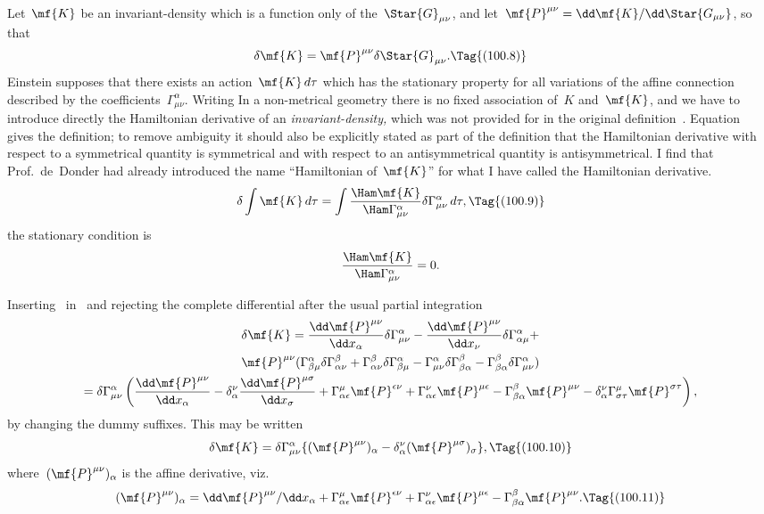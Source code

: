 \documentclass[12pt]{book}
\begin{document}
Let~$\mf{K}$ be an invariant\hyp{}density which is a function only of the~$\Star{G}_{\mu\nu}$, and
let~$\mf{P}^{\mu\nu} = \dd\mf{K}/\dd\Star{G_{\mu\nu}}$, so that
\[
\delta\mf{K} = \mf{P}^{\mu\nu}\delta\Star{G}_{\mu\nu}.
\Tag{(100.8)}
\]
Einstein supposes that there exists an action~$\mf{K}\,d\tau$ which has the stationary property for all variations
of the affine connection described by the coefficients~$\Gamma^\alpha_{\mu\nu}$.
Writing\footnotemark\footnotetext
     {In a non\hyp{}metrical geometry there is no fixed association of~$K$ and~$\mf{K}$, and we have to introduce
      directly the Hamiltonian derivative of an \emph{invariant\hyp{}density,} which was not provided for in
      the original definition~.
      Equation~ gives the definition; to remove ambiguity it should also be explicitly stated as part
      of the definition that the Hamiltonian derivative with respect to a symmetrical quantity is symmetrical and
      with respect to an antisymmetrical quantity is antisymmetrical.
      I find that Prof.~de~Donder had already introduced the name ``Hamiltonian of~$\mf{K}$'' for what I have called
      the Hamiltonian derivative.}
\[
\delta\int\mf{K}\,d\tau = \int\frac{\Ham\mf{K}}{\Ham\Gamma^\alpha_{\mu\nu}}\delta\Gamma^\alpha_{\mu\nu}\,d\tau,
\Tag{(100.9)}
\]
the stationary condition is
\[
\frac{\Ham\mf{K}}{\Ham\Gamma^\alpha_{\mu\nu}} = 0.
\]

Inserting~ in~ and rejecting the complete differential after the usual partial integration
\begin{multline*}
\delta\mf{K}  = \frac{\dd\mf{P}^{\mu\nu}}{\dd x_\alpha}\delta\Gamma^\alpha_{\mu\nu} -
               \frac{\dd\mf{P}^{\mu\nu}}{\dd x_\nu}\delta\Gamma^\alpha_{\alpha\mu} +\\
    \mf{P}^{\mu\nu}(\Gamma^\alpha_{\beta\mu}\delta\Gamma^\beta_{\alpha\nu} +
                   \Gamma^\beta_{\alpha\nu}\delta\Gamma^\alpha_{\beta\mu} -
                   \Gamma^\alpha_{\mu\nu}\delta\Gamma^\beta_{\beta\alpha} -
                   \Gamma^\beta_{\beta\alpha}\delta\Gamma^\alpha_{\mu\nu})\\
             = \delta\Gamma^\alpha_{\mu\nu}
  \left(
    \frac{\dd\mf{P}^{\mu\nu}}{\dd x_\alpha} - \delta^\nu_\alpha\frac{\dd\mf{P}^{\mu\sigma}}{\dd x_\sigma} +
    \Gamma^\mu_{\alpha\epsilon}\mf{P}^{\epsilon\nu} +
    \Gamma^\nu_{\alpha\epsilon}\mf{P}^{\mu\epsilon} -
    \Gamma^\beta_{\beta\alpha}\mf{P}^{\mu\nu} -
    \delta^\nu_\alpha\Gamma^\mu_{\sigma\tau}\mf{P}^{\sigma\tau}
  \right),
\end{multline*}
by changing the dummy suffixes.
This may be written
\[
\delta\mf{K} = \delta\Gamma^\alpha_{\mu\nu}\{(\mf{P}^{\mu\nu})_\alpha - \delta^\nu_\alpha(\mf{P}^{\mu\sigma})_\sigma\},
\Tag{(100.10)}
\]
where~$(\mf{P}^{\mu\nu})_\alpha$ is the affine derivative, viz.
\[
(\mf{P}^{\mu\nu})_\alpha = \dd\mf{P}^{\mu\nu}/\dd x_\alpha
       + \Gamma^{\mu}_{\alpha\epsilon}\mf{P}^{\epsilon\nu}
       + \Gamma^{\nu}_{\alpha\epsilon}\mf{P}^{\mu\epsilon}
       - \Gamma^{\beta}_{\beta\alpha}\mf{P}^{\mu\nu}.
\Tag{(100.11)}
\]
\end{document}
